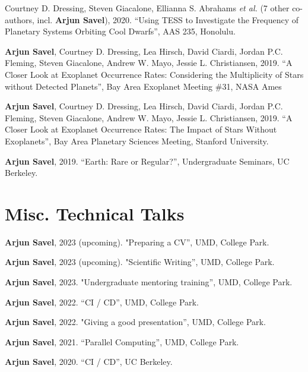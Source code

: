 \documentclass[letterpaper,10.5pt]{article}
\newcommand{\shorterSection}[1]{\vspace{-10pt}\section{#1}}
\begin{document}
\begin{list}{}{\cvlist}
\item[{\color{numcolor}\scriptsize4}] Courtney D. Dressing, Steven Giacalone, Ellianna S. Abrahams \emph{et al.} (7 other co-authors, incl. \textbf{Arjun Savel}), 2020. ``Using TESS to Investigate the Frequency of Planetary Systems Orbiting Cool Dwarfs'', AAS 235, Honolulu.


\item[{\color{numcolor}\scriptsize3}] \textbf{Arjun Savel}, Courtney D. Dressing, Lea Hirsch, David Ciardi, Jordan P.C. Fleming, Steven Giacalone, Andrew W. Mayo, Jessie L. Christiansen, 2019. “A Closer Look at Exoplanet Occurrence Rates: Considering the Multiplicity of Stars without Detected Planets”, Bay Area Exoplanet Meeting \#31, NASA Ames

\item[{\color{numcolor}\scriptsize2}] \textbf{Arjun Savel}, Courtney D. Dressing, Lea Hirsch, David Ciardi, Jordan P.C. Fleming, Steven Giacalone, Andrew W. Mayo, Jessie L. Christiansen, 2019. “A Closer Look at Exoplanet Occurrence Rates: The Impact of Stars Without Exoplanets”, Bay Area Planetary Sciences Meeting, Stanford University.

\item[{\color{numcolor}\scriptsize1}] \textbf{Arjun Savel}, 2019. “Earth: Rare or Regular?”, Undergraduate Seminars, UC Berkeley.

\end{list}

\shorterSection{Misc. Technical Talks}

\small
  \begin{list}{}{\cvlist}
\item[{\color{numcolor}\scriptsize7}] 
\textbf{Arjun Savel}, 2023 (upcoming). "Preparing a CV”, UMD, College Park.\item[{\color{numcolor}\scriptsize6}]
\textbf{Arjun Savel}, 2023 (upcoming). "Scientific Writing”, UMD, College Park.\item[{\color{numcolor}\scriptsize5}] \textbf{Arjun Savel}, 2023. "Undergraduate mentoring training”, UMD, College Park.
  \item[{\color{numcolor}\scriptsize4}] \textbf{Arjun Savel}, 2022. “CI / CD”, UMD, College Park.
  \item[{\color{numcolor}\scriptsize3}] \textbf{Arjun Savel}, 2022. "Giving a good presentation”, UMD, College Park.
  \item[{\color{numcolor}\scriptsize2}] \textbf{Arjun Savel}, 2021. “Parallel Computing”, UMD, College Park.
  \item[{\color{numcolor}\scriptsize1}] \textbf{Arjun Savel}, 2020. “CI / CD”, UC Berkeley.
  \end{list}
\end{document}
